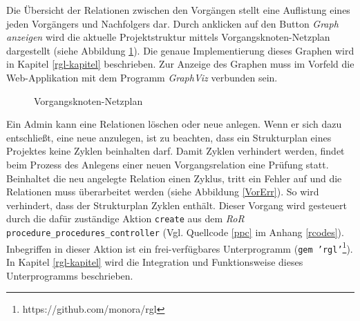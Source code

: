 \documentclass[a4paper,12pt,parskip,bibtotoc,liststotoc]{article}
\begin{document}
Die Übersicht der Relationen zwischen den Vorgängen stellt eine Auflistung eines jeden Vorgängers und Nachfolgers dar. Durch anklicken auf den Button \textit{Graph anzeigen} wird die aktuelle Projektstruktur mittels Vorgangsknoten-Netzplan dargestellt (siehe Abbildung \ref{Graphp}). Die genaue Implementierung dieses Graphen wird in Kapitel \ref{rgl-kapitel} beschrieben. Zur Anzeige des Graphen muss im Vorfeld die Web-Applikation mit dem Programm \textit{GraphViz} verbunden sein.\\
\begin{figure}[h!]
  \begin{center}
    \caption{Vorgangsknoten-Netzplan}  \label{Graphp}
  \end{center}
\end{figure}

Ein Admin kann eine Relationen löschen oder neue anlegen. Wenn er sich dazu entschließt, eine neue anzulegen, ist zu beachten, dass ein Strukturplan eines Projektes keine Zyklen beinhalten darf. Damit Zyklen verhindert werden, findet beim Prozess des Anlegens einer neuen Vorgangsrelation eine Prüfung statt. Beinhaltet die neu angelegte Relation einen Zyklus, tritt ein Fehler auf und die Relationen muss überarbeitet werden (siehe Abbildung \ref{VorErr}). So wird verhindert, dass der Strukturplan Zyklen enthält. Dieser Vorgang wird gesteuert durch die dafür zuständige Aktion \texttt{create} aus dem \textit{RoR} \texttt{procedure\_procedures\_controller} (Vgl. Quellcode \ref{ppc} im Anhang \ref{rcodes}). Inbegriffen in dieser Aktion ist ein frei-verfügbares Unterprogramm (\texttt{gem 'rgl'}\footnote{https://github.com/monora/rgl}). In Kapitel \ref{rgl-kapitel} wird die Integration und Funktionsweise dieses Unterprogramms beschrieben. \\
\end{document}
